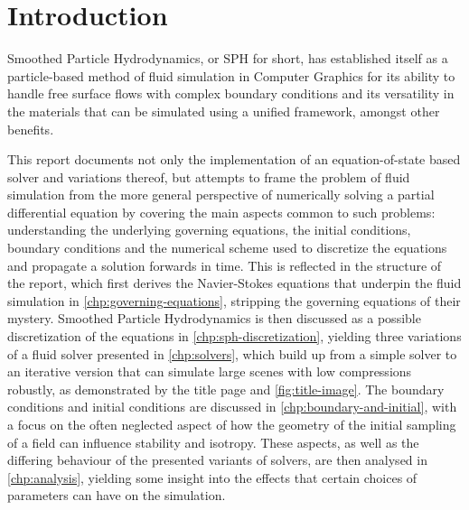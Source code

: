 
\chapter{Introduction}

Smoothed Particle Hydrodynamics, or SPH for short, has established itself as a particle-based method of fluid simulation in Computer Graphics for its ability to handle free surface flows with complex boundary conditions and its versatility in the materials that can be simulated using a unified framework, amongst other benefits.

This report documents not only the implementation of an equation-of-state based solver and variations thereof, but attempts to frame the problem of fluid simulation from the more general perspective of numerically solving a partial differential equation by covering the main aspects common to such problems: understanding the underlying governing equations, the initial conditions, boundary conditions and the numerical scheme used to discretize the equations and propagate a solution forwards in time. This is reflected in the structure of the report, which first derives the Navier-Stokes equations that underpin the fluid simulation in \autoref{chp:governing-equations}, stripping the governing equations of their mystery. Smoothed Particle Hydrodynamics is then discussed as a possible discretization of the equations in \autoref{chp:sph-discretization}, yielding three variations of a fluid solver presented in \autoref{chp:solvers}, which build up from a simple solver to an iterative version that can simulate large scenes with low compressions robustly, as demonstrated by the title page and \autoref{fig:title-image}. The boundary conditions and initial conditions are discussed in \autoref{chp:boundary-and-initial}, with a focus on the often neglected aspect of how the geometry of the initial sampling of a field can influence stability and isotropy. These aspects, as well as the differing behaviour of the presented variants of solvers, are then analysed in \autoref{chp:analysis}, yielding some insight into the effects that certain choices of parameters can have on the simulation.\\


